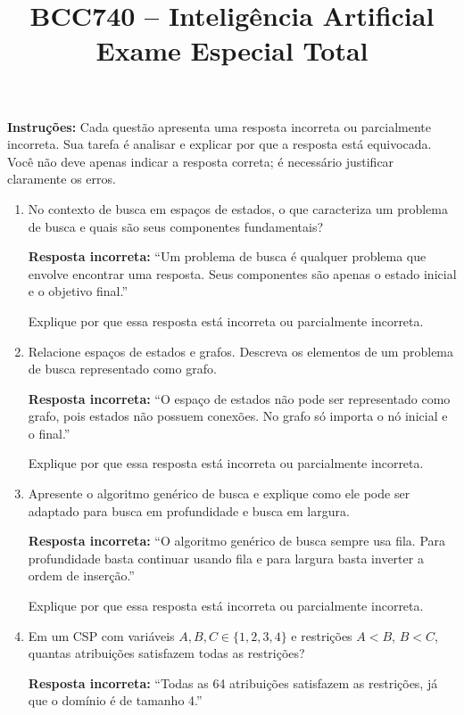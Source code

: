 \documentclass[12pt]{article}
\title{BCC740 – Inteligência Artificial \\ Exame Especial Total}
\author{}
\date{}
\begin{document}
\maketitle

\vspace{-0.5cm}

\noindent \textbf{Instruções:}  
Cada questão apresenta uma resposta incorreta ou parcialmente incorreta. Sua tarefa é analisar e explicar por que a resposta está equivocada.  
Você não deve apenas indicar a resposta correta; é necessário justificar claramente os erros.

\begin{enumerate}

\item No contexto de busca em espaços de estados, o que caracteriza um problema de busca e quais são seus componentes fundamentais?

\textbf{Resposta incorreta:}  
“Um problema de busca é qualquer problema que envolve encontrar uma resposta. Seus componentes são apenas o estado inicial e o objetivo final.”  

Explique por que essa resposta está incorreta ou parcialmente incorreta.

\item Relacione espaços de estados e grafos. Descreva os elementos de um problema de busca representado como grafo.

\textbf{Resposta incorreta:}  
“O espaço de estados não pode ser representado como grafo, pois estados não possuem conexões. No grafo só importa o nó inicial e o final.”  

Explique por que essa resposta está incorreta ou parcialmente incorreta.

\item Apresente o algoritmo genérico de busca e explique como ele pode ser adaptado para busca em profundidade e busca em largura.

\textbf{Resposta incorreta:}  
“O algoritmo genérico de busca sempre usa fila. Para profundidade basta continuar usando fila e para largura basta inverter a ordem de inserção.”  

Explique por que essa resposta está incorreta ou parcialmente incorreta.

\item Em um CSP com variáveis \(A,B,C \in \{1,2,3,4\}\) e restrições \(A<B\), \(B<C\), quantas atribuições satisfazem todas as restrições?

\textbf{Resposta incorreta:}  
“Todas as 64 atribuições satisfazem as restrições, já que o domínio é de tamanho 4.”  


\end{enumerate}
\end{document}
